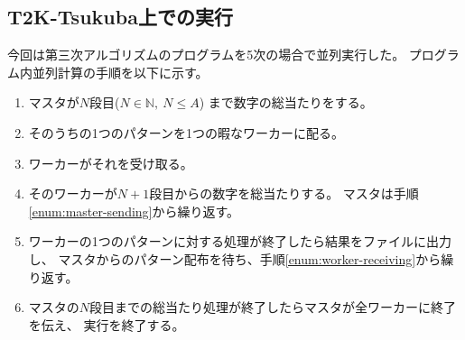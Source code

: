 \subsection{T2K-Tsukuba上での実行}
今回は第三次アルゴリズムのプログラムを5次の場合で並列実行した。
プログラム内並列計算の手順を以下に示す。
\begin{enumerate}
\item マスタが$N$段目($N \in \mathbb{N}, \ N \leq A$)
	まで数字の総当たりをする。
\item そのうちの1つのパターンを1つの暇なワーカーに配る。 \label{enum:master-sending}
\item ワーカーがそれを受け取る。 \label{enum:worker-receiving}
\item そのワーカーが$N+1$段目からの数字を総当たりする。
	マスタは手順\ref{enum:master-sending}から繰り返す。
\item ワーカーの1つのパターンに対する処理が終了したら結果をファイルに出力し、
	マスタからのパターン配布を待ち、手順\ref{enum:worker-receiving}から繰り返す。
\item マスタの$N$段目までの総当たり処理が終了したらマスタが全ワーカーに終了を伝え、
実行を終了する。
\end{enumerate}
